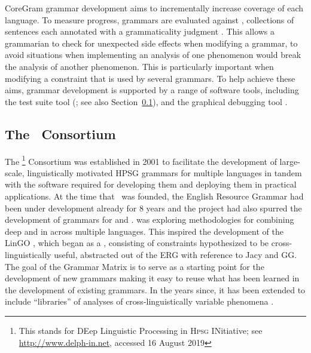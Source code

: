 \documentclass[output=paper,nonflat]{langsci/langscibook}
\begin{document}
CoreGram grammar development aims to incrementally increase coverage of each language.
To measure progress, grammars are evaluated against ,
collections of sentences each annotated with a grammaticality judgment \citep{ONK97a,Mueller2004f}.
This allows a grammarian to check for unexpected side effects when modifying a grammar,
to avoid situations when implementing an analysis of one phenomenon
would break the analysis of another phenomenon.
This is particularly important when modifying a constraint that is used by several grammars.
To help achieve these aims, grammar development is supported by a range of software tools,
including the test suite tool \itsdb\is{\itsdb} (\citealp{Oepen:01}; see also Section~\ref{cl:delphin}),
and the graphical debugging tool  \citep{DER2010a-u,DER2013a}.


\subsection{The \delphin\ Consortium}
\label{cl:delphin}


The \delphin\footnote{This stands for DEep Linguistic
  Processing in \textsc{Hpsg} INitiative; see \url{http://www.delph-in.net}, accessed 16 August 2019} Consortium
was established in 2001 to facilitate the development of large-scale,
linguistically motivated HPSG grammars for multiple languages in tandem
with the software required for developing them and deploying them in
practical applications. At the time that \delphin\ was founded, the
English Resource Grammar
\citep[ERG;][]{Flickinger2000a,Flickinger2011a-u} had been under
development already for 8 years and the  project
\citep{Wahlster2000a-ed} had also spurred the development of grammars for
 \citep[GG;][]{MK2000a-cr,Crysmann2003b} and 
\citep*[Jacy;][]{SBB2016a}. 
\citep*{Callmeier-etal:2004} was exploring methodologies for combining
deep and  in  across multiple
languages. This inspired the development of the LinGO 
\citep*{BFO2002a-u}, which began as a , consisting of
constraints hypothesized to be cross-linguistically useful, abstracted
out of the ERG with reference to Jacy and GG. The goal of the Grammar
Matrix is to serve as a starting point for the development of new
grammars making it easy to reuse what has been learned in the
development of existing grammars. In the years since, it has been
extended to include ``libraries'' of analyses of cross-linguistically
variable phenomena \citep[e.g.,][]{Drellishak2009a-u,BDFPS2010a-u}.
\end{document}

